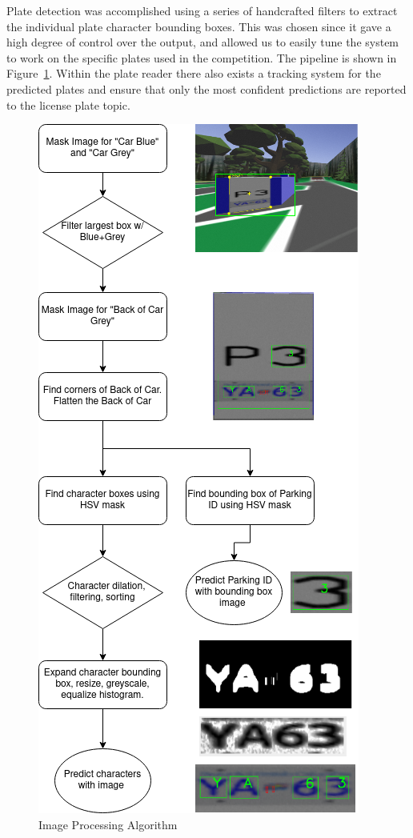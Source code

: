\documentclass[titlepage, twocolumn]{article}
\begin{document}
Plate detection was accomplished using a series of handcrafted filters to extract the individual plate character bounding boxes. This was chosen since it gave a high degree of control over the output, and allowed us to easily tune the system to work on the specific plates used in the competition. The pipeline is shown in Figure~\ref{fig:platepipeline}. Within the plate reader there also exists a tracking system for the predicted plates and ensure that only the most confident predictions are reported to the license plate topic.

\begin{figure}[H]
\centering
\includegraphics[width=\linewidth]{Image Processing Algorithm.drawio.png}
\caption{Image Processing Algorithm}
\label{fig:platepipeline}
\end{figure}
\end{document}
